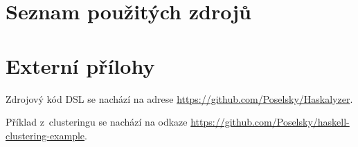\documentclass[male, czech]{kithesis}
\begin{document}
\chapter{Seznam použitých zdrojů}


\printbibliography[heading=none]
\appendix


\chapter{Externí přílohy}

Zdrojový kód DSL se nachází na adrese \href{https://github.com/Poselsky/Haskalyzer}{https://github.com/Poselsky/Haskalyzer}.

Příklad z~clusteringu se nachází na odkaze \href{https://github.com/Poselsky/haskell-clustering-example}{https://github.com/Poselsky/haskell-clustering-example}.
\end{document}
